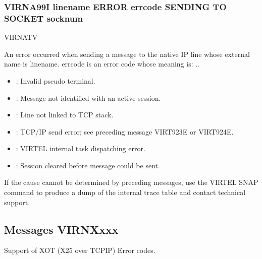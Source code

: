 \documentclass[letterpaper,10pt,english]{sphinxmanual}
\begin{document}
\subsubsection{VIRNA99I linename ERROR errcode SENDING TO SOCKET socknum}
\label{\detokenize{messages:virna99i-linename-error-errcode-sending-to-socket-socknum}}\begin{description}
\sphinxAtStartPar
VIRNATV

\sphinxAtStartPar
An error occurred when sending a message to the native IP line whose external name is linename. errcode is an error code whose meaning is:
..
\begin{itemize}
\item {} 
 : Invalid pseudo terminal.

\item {} 
 : Message not identified with an active session.

\item {} 
 : Line not linked to TCP stack.

\item {} 
 : TCP/IP send error; see preceding message VIRT923E or VIRT924E.

\item {} 
 : VIRTEL internal task dispatching error.

\item {} 
 : Session cleared before message could be sent.

\end{itemize}

\sphinxAtStartPar
If the cause cannot be determined by preceding messages, use the VIRTEL SNAP command to produce a dump of the internal trace table and contact technical support.

\end{description}


\subsection{Messages VIRNXxxx}
\label{\detokenize{messages:messages-virnxxxx}}
\sphinxAtStartPar
Support of XOT (X25 over TCPIP) Error codes.
\end{document}
